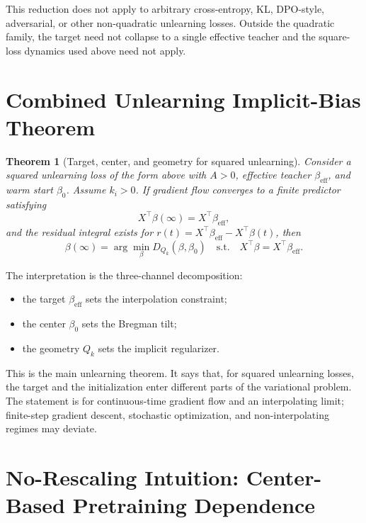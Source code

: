 \documentclass[11pt]{article}
\newtheorem{theorem}{Theorem}
\begin{document}
This reduction does not apply to arbitrary cross-entropy, KL, DPO-style, adversarial, or other non-quadratic unlearning losses. Outside the quadratic family, the target need not collapse to a single effective teacher and the square-loss dynamics used above need not apply.

\section{Combined Unlearning Implicit-Bias Theorem}

\begin{theorem}[Target, center, and geometry for squared unlearning]
Consider a squared unlearning loss of the form above with \(A>0\), effective teacher \(\beta_{\mathrm{eff}}\), and warm start \(\beta_0\). Assume \(k_i>0\). If gradient flow converges to a finite predictor satisfying
\begin{equation}
    X^\top\beta(\infty)=X^\top\beta_{\mathrm{eff}},
\end{equation}
and the residual integral exists for \(r(t)=X^\top\beta_{\mathrm{eff}}-X^\top\beta(t)\), then
\begin{equation}
    \boxed{
    \beta(\infty)
    =
    \arg\min_{\beta}
    D_{Q_k}(\beta,\beta_0)
    \quad
    \text{s.t.}
    \quad
    X^\top\beta=X^\top\beta_{\mathrm{eff}}
    }.
\end{equation}
\end{theorem}

The interpretation is the three-channel decomposition:
\begin{itemize}
    \item the target \(\beta_{\mathrm{eff}}\) sets the interpolation constraint;
    \item the center \(\beta_0\) sets the Bregman tilt;
    \item the geometry \(Q_k\) sets the implicit regularizer.
\end{itemize}
This is the main unlearning theorem. It says that, for squared unlearning losses, the target and the initialization enter different parts of the variational problem. The statement is for continuous-time gradient flow and an interpolating limit; finite-step gradient descent, stochastic optimization, and non-interpolating regimes may deviate.



\section{No-Rescaling Intuition: Center-Based Pretraining Dependence}
\end{document}
